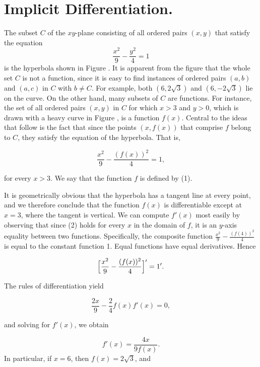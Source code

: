 \section{Implicit Differentiation.} \label{sec 1.9}
The subset $C$ of the $xy$-plane consisting of all ordered pairs $(x, y)$ that satisfy the equation
\begin{equation}
\frac{x^2}{9} - \frac{y^2}{4} = 1               
\label{eq1.9.1}
\end{equation}
is the hyperbola shown in Figure .
It is apparent from the figure that the whole set $C$ is not a function, since it is easy to find instances of ordered pairs $(a, b)$ and $(a, c)$ in $C$ with $b \neq C$. For example, both $(6, 2\sqrt3)$ and $(6, - 2\sqrt3)$ lie on the curve. On the other hand, many subsets of $C$ are functions. For instance, the set of all ordered pairs $(x, y)$ in $C$ for which $x > 3$ and $y > 0$, which is drawn with a heavy curve in Figure , is a function $f(x)$. Central to the ideas that follow is the fact that since the points $(x, f(x))$ that comprise
$f$ belong to $C$, they satisfy the equation of the hyperbola. That is, 

\begin{equation}
\frac{x^2}{9} - \frac{ (f(x))^2}{4} = 1, 
\label{eq1.9.2}
\end{equation}

for every $x > 3$. We say that the function $f$ is defined  by (1).

It is geometrically obvious that the hyperbola has a tangent line at every point, and we therefore conclude that the function $f(x)$ is differentiable except at $x = 3$, where the tangent is vertical. We can compute $f'(x)$ most easily by observing that since (2) holds for every $x$ in the domain of $f$, it is an $y$-axis equality between two functions. Specifically, the composite function $\frac{x^2}{9} - \frac{(f(4))^2}{4}$ is equal to the constant function 1. Equal functions have equal derivatives. Hence


$$
\Bigl[\frac{x^2}{9} - \frac{(f(x))^2}{4} \Bigr]' =  1'.
$$

The rules of differentiation yield

$$
\frac{2x}{9} -\frac{2}{4} f(x)f'(x) = 0 , 
$$

and solving for $f'(x)$, we obtain

\begin{equation}
f'(x) = \frac{4x}{9f(x)}.
\label{eq1.9.3}
\end{equation}
In particular, if $x = 6$, then $f(x) = 2\sqrt3$, and

